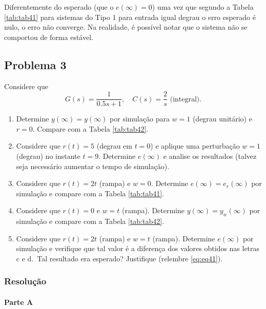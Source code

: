 \documentclass[
]{book}
\providecommand{\tightlist}{%
  \setlength{\itemsep}{0pt}\setlength{\parskip}{0pt}}
\begin{document}
Diferentemente do esperado (que o \(e(\infty) = 0\)) uma vez que segundo a Tabela \ref{tab:tab41} para sistemas do Tipo 1 para entrada igual degrau o erro esperado é nulo, o erro não converge. Na realidade, é possível notar que o sistema não se comportou de forma estável.

\hypertarget{problema-3-2}{%
\subsection*{Problema 3}\label{problema-3-2}}

Considere que
\[
G(s) = \frac {1}{0.5s +1}, \quad C(s) = \frac {2}{s} \text{ (integral)}.
\]

\begin{enumerate}
\def\labelenumi{\alph{enumi}.}
\tightlist
\item
  Determine \(y(\infty) = y(\infty)\) por simulação para \(w =1\) (degrau unitário) e \(r=0\). Compare com a Tabela \ref{tab:tab42}.
\item
  Considere que \(r(t) = 5\) (degrau em \(t=0\)) e aplique uma perturbação \(w=1\) (degrau) no instante \(t=9\). Determine \(e(\infty)\) e analise os resultados (talvez seja necessário aumentar o tempo de simulação).
\item
  Considere que \(r(t) = 2t\) (rampa) e \(w=0\). Determine \(e(\infty) = e_r(\infty)\) por simulação e compare com a Tabela \ref{tab:tab41}.
\item
  Considere que \(r(t) = 0\) e \(w=t\) (rampa). Determine \(y(\infty) = y_w(\infty)\) por simulação e compare com a Tabela \ref{tab:tab42}.
\item
  Considere que \(r(t) = 2t\) (rampa) e \(w=t\) (rampa). Determine \(e(\infty)\) por simulação e verifique que tal valor é a diferença dos valores obtidos nas letras c e d.~Tal resultado era esperado? Justifique (relembre \eqref{eq:eq41}).
\end{enumerate}

\hypertarget{resoluuxe7uxe3o-11}{%
\subsubsection*{Resolução}\label{resoluuxe7uxe3o-11}}

\hypertarget{parte-a-3}{%
\paragraph*{Parte A}\label{parte-a-3}}
\end{document}
